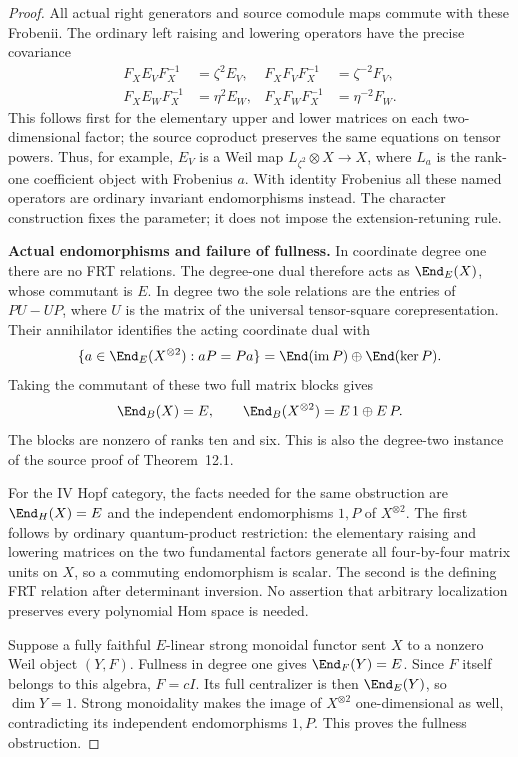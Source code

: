 \begin{proof}
All actual right generators and source comodule maps
commute with these Frobenii. The ordinary left raising
and lowering operators have the precise covariance
\[
\begin{aligned}
 F_XE_VF_X^{-1}&=\zeta^2E_V,&
 F_XF_VF_X^{-1}&=\zeta^{-2}F_V,\\
 F_XE_WF_X^{-1}&=\eta^2E_W,&
 F_XF_WF_X^{-1}&=\eta^{-2}F_W.
\end{aligned}
\]
This follows first for the elementary upper and lower
matrices on each two-dimensional factor; the source
coproduct preserves the same equations on tensor powers.
Thus, for example, $E_V$ is a Weil map
$L_{\zeta^2}\otimes X\to X$, where $L_a$ is the rank-one
coefficient object with Frobenius $a$.
With identity Frobenius all these named operators are
ordinary invariant endomorphisms instead.
The character construction fixes the parameter; it does
not impose the extension-retuning rule.

\par\smallskip\noindent\textbf{Actual endomorphisms and failure of fullness.}\quad
In coordinate degree one there are no FRT relations.
The degree-one dual therefore acts as $\End_E(X)$,
whose commutant is $E$. In degree two the sole relations
are the entries of $PU-UP$, where $U$ is the matrix
of the universal tensor-square corepresentation.
Their annihilator identifies the acting coordinate dual
with
\[
 \{a\in\End_E(X^{\otimes2}):aP=Pa\}
   =\End(\operatorname{im}P)\oplus\End(\ker P).
\]
Taking the commutant of these two full matrix blocks gives
\[
 \End_B(X)=E,\qquad
 \End_B(X^{\otimes2})=E\,1\oplus E\,P.
\]
The blocks are nonzero of ranks ten and six.
This is also the degree-two instance of the source
proof of Theorem~12.1.

For the IV Hopf category, the facts needed for the same
obstruction are $\End_H(X)=E$ and the independent
endomorphisms $1,P$ of $X^{\otimes2}$.
The first follows by ordinary quantum-product restriction:
the elementary raising and lowering matrices on the two
fundamental factors generate all four-by-four matrix
units on $X$, so a commuting endomorphism is scalar.
The second is the defining FRT relation after determinant
inversion. No assertion that arbitrary localization
preserves every polynomial Hom space is needed.

Suppose a fully faithful $E$-linear strong monoidal
functor sent $X$ to a nonzero Weil object $(Y,F)$.
Fullness in degree one gives $\End_F(Y)=E$.
Since $F$ itself belongs to this algebra, $F=cI$.
Its full centralizer is then $\End_E(Y)$, so $\dim Y=1$.
Strong monoidality makes the image of $X^{\otimes2}$
one-dimensional as well, contradicting its independent
endomorphisms $1,P$. This proves the fullness obstruction.


\end{proof}

